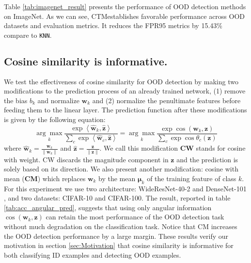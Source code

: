 \documentclass[nohyperref]{article}
\theoremstyle{plain}
\theoremstyle{definition}
\theoremstyle{remark}
\newcommand{\shortname}{CTM}
\begin{document}
Table \ref{tab:imagenet_result} presents the performance of OOD detection methods on ImageNet. 
As we can see, \shortname\;establishes favorable performance across OOD datasets and evaluation metrics. It reduces the FPR95 metrics by 15.43\% compare to \texttt{KNN}. 

\subsection{Cosine similarity is informative.}
\label{sec:ablation}
We test the effectiveness of cosine similarity for OOD detection by making two modifications to the prediction process of an already trained network, (1) remove the bias $b_k$ and normalize $\mathbf{w}_k$ and (2) normalize the penultimate features before feeding them to the linear layer. The prediction function after these modifications is given by the following equation:
\begin{equation*}
    \underset{k}{\arg\max} \frac{\exp{ \left<\hat{\mathbf{w}}_k, \hat{\mathbf{z}}\right> }}{\sum_{c} \exp{ \left<\hat{\mathbf{w}}_c , \hat{\mathbf{z}}\right> }} = \underset{k}{\arg\max} \frac{\exp{ \cos (\mathbf{w}_k, \mathbf{z}) }}{\sum_{c} \exp{ \cos\theta_c(\mathbf{z})  }}
\end{equation*}
where $\hat{\mathbf{w}}_k = \frac{\mathbf{w}_k}{\|\mathbf{w}_k\|}$ and $\hat{\mathbf{z}} = \frac{\mathbf{z}}{\|\mathbf{z}\|}$.
We call this modification \textbf{CW} stands for cosine with weight. 
CW discards the magnitude component in $\mathbf{z}$ and the prediction is solely based on its direction. 
We also present another modification: cosine with mean (\textbf{CM}) which replaces $\mathbf{w}_k$ by the mean $\boldsymbol{\mu}_k$ of the training feature of class $k$.
For this experiment we use two architecture: WideResNet-40-2 \cite{zagoruyko2016wide} and DenseNet-101 \cite{huang2017densely}, and two datasets: CIFAR-10 and CIFAR-100.  
The result, reported in table \ref{tab:acc_angular_pred}, suggests that using only angular information $\cos (\mathbf{w}_k, \mathbf{z})$ can retain the most performance of the OOD detection task without much degradation on the classification task. 
Notice that CM increases the OOD detection performance by a large margin. 
These results verify our motivation in section \ref{sec:Motivation} that cosine similarity is informative for both classifying ID examples and detecting OOD examples.
\end{document}
